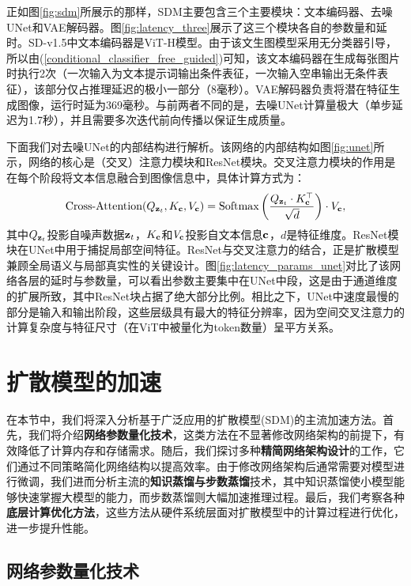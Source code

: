 \documentclass[11pt,a4paper,UTF8]{ctexart}
\begin{document}
正如图\ref{fig:sdm}所展示的那样，SDM主要包含三个主要模块：文本编码器、去噪UNet和VAE解码器。图\ref{fig:latency_three}展示了这三个模块各自的参数量和延时。SD-v1.5中文本编码器是ViT-H模型\cite{radford2021learning}。由于该文生图模型采用无分类器引导，所以由(\ref{conditional_classifier_free_guided})可知，该文本编码器在生成每张图片时执行2次（一次输入为文本提示词输出条件表征，一次输入空串输出无条件表征），该部分仅占推理延迟的极小一部分（8毫秒）。VAE解码器负责将潜在特征生成图像，运行时延为369毫秒。与前两者不同的是，去噪UNet计算量极大（单步延迟为1.7秒），并且需要多次迭代前向传播以保证生成质量。

下面我们对去噪UNet的内部结构进行解析。该网络的内部结构如图\ref{fig:unet}所示，网络的核心是（交叉）注意力模块和ResNet模块。交叉注意力模块的作用是在每个阶段将文本信息融合到图像信息中，具体计算方式为：
\begin{equation*}
    \text{Cross-Attention}(Q_{\mathbf{z}_t},K_{\mathbf{c}},V_{\mathbf{c}})=\text{Softmax}\left(\frac{Q_{\mathbf{z}_t}\cdot K_{\mathbf{c}}^{\top}}{\sqrt{d}}\right)\cdot V_{\mathbf{c}},
\end{equation*}
其中$Q_{\mathbf{z}_t}$投影自噪声数据$\mathbf{z}_t$，$K_{\mathbf{c}}$和$V_{\mathbf{c}}$投影自文本信息$\mathbf{c}$，$d$是特征维度。ResNet模块在UNet中用于捕捉局部空间特征。ResNet与交叉注意力的结合，正是扩散模型兼顾全局语义与局部真实性的关键设计。图\ref{fig:latency_params_unet}对比了该网络各层的延时与参数量，可以看出参数主要集中在UNet中段，这是由于通道维度的扩展所致，其中ResNet块占据了绝大部分比例。相比之下，UNet中速度最慢的部分是输入和输出阶段，这些层级具有最大的特征分辨率，因为空间交叉注意力的计算复杂度与特征尺寸（在ViT中被量化为token数量）呈平方关系。


\section{扩散模型的加速}

在本节中，我们将深入分析基于广泛应用的扩散模型(SDM)的主流加速方法。首先，我们将介绍\textbf{网络参数量化技术}，这类方法在不显著修改网络架构的前提下，有效降低了计算内存和存储需求。随后，我们探讨多种\textbf{精简网络架构设计}的工作，它们通过不同策略简化网络结构以提高效率。由于修改网络架构后通常需要对模型进行微调，我们进而分析主流的\textbf{知识蒸馏与步数蒸馏}技术，其中知识蒸馏使小模型能够快速掌握大模型的能力，而步数蒸馏则大幅加速推理过程。最后，我们考察各种\textbf{底层计算优化方法}，这些方法从硬件系统层面对扩散模型中的计算过程进行优化，进一步提升性能。

\subsection{网络参数量化技术}
\end{document}
